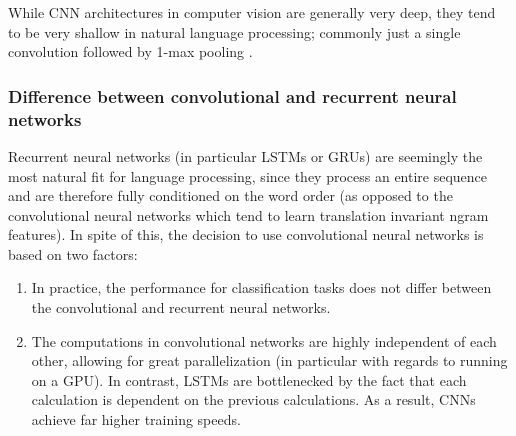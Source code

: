 While CNN architectures in computer vision are generally very deep, they tend to
be very shallow in natural language processing; commonly just a single
convolution followed by 1-max pooling \citep{zhang2015conv}.

\subsubsection{Difference between convolutional and recurrent neural networks}
Recurrent neural networks (in particular LSTMs or GRUs) are seemingly the most
natural fit for language processing, since they process an entire sequence and
are therefore fully conditioned on the word order (as opposed to the
convolutional neural networks which tend to learn translation invariant ngram
features). In spite of this, the decision to use convolutional neural networks
is based on two factors:
\begin{enumerate}
\item In practice, the performance for classification tasks does not differ
  between the convolutional and recurrent neural networks.\citep{cnnrnn}
\item The computations in convolutional networks are highly independent of
  each other, allowing for great parallelization (in particular with regards to
  running on a GPU). In contrast, LSTMs are bottlenecked by the fact that each
  calculation is dependent on the previous calculations. As a result, CNNs
  achieve far higher training speeds.\citep{facebook}
\end{enumerate}

